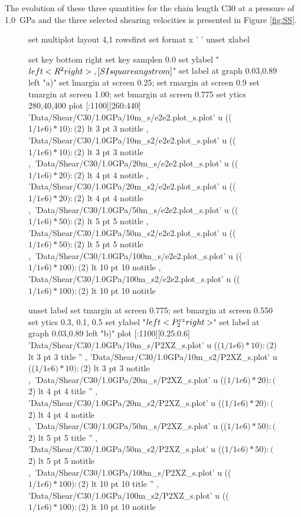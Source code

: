 \documentclass[aps,prb,reprint,superscriptaddress, a4paper]{revtex4-1}
\begin{document}
The evolution of these three quantities for the chain length C30 at a pressure of  \SI{1.0}{\giga\pascal} and the three selected shearing velocities is presented in Figure \ref{fig:SS}.


\begin{figure}
    	\begin{center}
		\begin{gnuplot}[terminal=pdf, terminaloptions={size \SERFigwidth cm, \SERFigheight cm color solid}]
			set multiplot layout 4,1 rowsfirst
			set format x ' '
			unset xlabel

			set key bottom right
			set key samplen  0.0
			set ylabel "$\\left< R^2\\right>  \\,[\\SI{}{\\square\\angstrom}]$"          
			set label at graph 0.03,0.89 left "a)"
			set lmargin at screen 0.25; set rmargin at screen 0.9
			set tmargin at screen 1.00; set bmargin at screen 0.775
			set ytics 280,40,400 
			plot [:1100][260:440] 	'Data/Shear/C30/1.0GPa/10m_s/e2e2.plot_s.plot'  u  (($1/1e6)*10):($2) lt 3 pt 3 notitle  , 'Data/Shear/C30/1.0GPa/10m_s2/e2e2.plot_s.plot'  u (($1/1e6)*10):($2)  lt 3 pt 3 notitle ,\
								'Data/Shear/C30/1.0GPa/20m_s/e2e2.plot_s.plot'  u  (($1/1e6)*20):($2) lt 4 pt 4 notitle  , 'Data/Shear/C30/1.0GPa/20m_s2/e2e2.plot_s.plot'  u (($1/1e6)*20):($2)  lt 4 pt 4 notitle ,\
								'Data/Shear/C30/1.0GPa/50m_s/e2e2.plot_s.plot'   u (($1/1e6)*50):($2) lt 5 pt 5 notitle  , 'Data/Shear/C30/1.0GPa/50m_s2/e2e2.plot_s.plot' u  (($1/1e6)*50):($2)  lt 5 pt 5 notitle ,\
								'Data/Shear/C30/1.0GPa/100m_s/e2e2.plot_s.plot' u  (($1/1e6)*100):($2) lt 10 pt 10 notitle  , 'Data/Shear/C30/1.0GPa/100m_s2/e2e2.plot_s.plot' u (($1/1e6)*100):($2) lt 10 pt 10  notitle 
			
			unset label
			set tmargin at screen 0.775; set bmargin at screen 0.550
			set ytics 0.3, 0.1, 0.5			
			set ylabel "$\\left<P_{2}^{xz}\\right>$"        
			set label at graph 0.03,0.89 left "b)"  
			plot  [:1100][0.25:0.6]	'Data/Shear/C30/1.0GPa/10m_s/P2XZ_s.plot' u   (($1/1e6)*10):($2) lt 3 pt 3 title '' , 'Data/Shear/C30/1.0GPa/10m_s2/P2XZ_s.plot' u   (($1/1e6)*10):($2) lt 3 pt 3 notitle  ,\
								'Data/Shear/C30/1.0GPa/20m_s/P2XZ_s.plot' u   (($1/1e6)*20):($2) lt 4 pt 4 title '' , 'Data/Shear/C30/1.0GPa/20m_s2/P2XZ_s.plot' u   (($1/1e6)*20):($2) lt 4 pt 4 notitle  ,\
								'Data/Shear/C30/1.0GPa/50m_s/P2XZ_s.plot' u  (($1/1e6)*50):($2)  lt 5 pt 5 title '' , 'Data/Shear/C30/1.0GPa/50m_s2/P2XZ_s.plot' u  (($1/1e6)*50):($2)  lt 5 pt 5 notitle ,\
								'Data/Shear/C30/1.0GPa/100m_s/P2XZ_s.plot' u  (($1/1e6)*100):($2) lt 10 pt 10 title '' , 'Data/Shear/C30/1.0GPa/100m_s2/P2XZ_s.plot' u (($1/1e6)*100):($2) lt 10 pt 10 notitle 


\end{gnuplot}
\end{center}
\end{figure}
\end{document}
